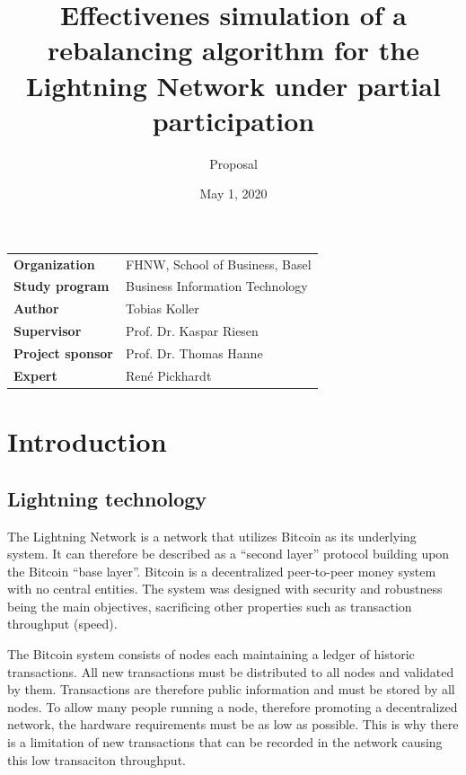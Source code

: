 \documentclass[final]{fhnwreport}       %
\title{Effectivenes simulation of a rebalancing
algorithm for the Lightning Network under partial
participation}                          %
\author{Proposal}                       %
\date{May 1, 2020}                      %
\begin{document}
\maketitle

\vspace*{-1cm}						    %
\vfill
{
\renewcommand\arraystretch{2}
\begin{center}
\begin{tabular}{>{\bf}p{4cm} l}
Organization                  &    FHNW, School of Business, Basel\\
Study program                 &    Business Information Technology\\
Author   	                  &    Tobias Koller\\
Supervisor                    &    Prof. Dr. Kaspar Riesen\\
Project sponsor               &    Prof. Dr. Thomas Hanne\\
Expert                        &    René Pickhardt
\end{tabular}
\end{center}
}
\clearpage


\section{Introduction}

\subsection{Lightning technology}

The Lightning Network is a network that utilizes Bitcoin as its underlying system. It can therefore be described as a ``second layer'' protocol building upon the Bitcoin ``base layer''. Bitcoin is a decentralized peer-to-peer money system with no central entities. The system was designed with security and robustness being the main objectives, sacrificing other properties such as transaction throughput (speed). 

The Bitcoin system consists of nodes each maintaining a ledger of historic transactions. All new transactions must be distributed to all nodes and validated by them. Transactions are therefore public information and must be stored by all nodes. To allow many people running a node, therefore promoting a decentralized network, the hardware requirements must be as low as possible. This is why there is a limitation of new transactions that can be recorded in the network causing this low transaciton throughput.
\end{document}
